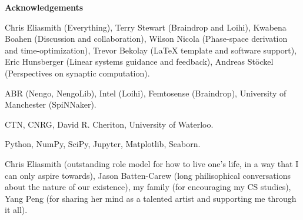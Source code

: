 {}
\begin{center}\textbf{Acknowledgements}\end{center}

Chris Eliasmith (Everything),
Terry Stewart (Braindrop and Loihi),
Kwabena Boahen (Discussion and collaboration),
Wilson Nicola (Phase-space derivation and time-optimization),
Trevor Bekolay (\LaTeX{} template and software support),
Eric Hunsberger (Linear systems guidance and feedback),
Andreas St\"ockel (Perspectives on synaptic computation).

ABR (Nengo, NengoLib), Intel (Loihi), Femtosense (Braindrop), University of Manchester (SpiNNaker).

CTN, CNRG, David R. Cheriton, University of Waterloo.

Python, NumPy, SciPy, Jupyter, Matplotlib, Seaborn.

Chris Eliasmith (outstanding role model for how to live one's life, in a way that I can only aspire towards),
Jason Batten-Carew (long philisophical conversations about the nature of our existence),
my family (for encouraging my CS studies),
Yang Peng (for sharing her mind as a talented artist and supporting me through it all).

\cleardoublepage
